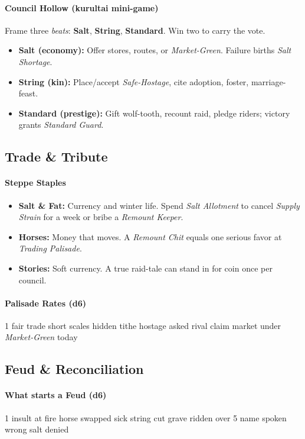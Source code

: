 \paragraph{Council Hollow (kurultai mini-game)}
Frame three \emph{beats}: \textbf{Salt}, \textbf{String}, \textbf{Standard}.  
Win two to carry the vote.
\begin{itemize}
\item \textbf{Salt (economy):} Offer stores, routes, or \emph{Market-Green}. Failure births \emph{Salt Shortage}.
\item \textbf{String (kin):} Place/accept \emph{Safe-Hostage}, cite adoption, foster, marriage-feast.
\item \textbf{Standard (prestige):} Gift wolf-tooth, recount raid, pledge riders; victory grants \emph{Standard Guard}.
\end{itemize}
\subsection*{Trade \& Tribute}

\paragraph{Steppe Staples}
\begin{itemize}
\item \textbf{Salt \& Fat:} Currency and winter life. Spend \emph{Salt Allotment} to cancel \emph{Supply Strain} for a week or bribe a \emph{Remount Keeper}.
\item \textbf{Horses:} Money that moves. A \emph{Remount Chit} equals one serious favor at \emph{Trading Palisade}.
\item \textbf{Stories:} Soft currency. A true raid-tale can stand in for coin once per council.
\end{itemize}

\paragraph{Palisade Rates (d6)}
1 fair trade  short scales  hidden tithe  hostage asked  rival claim  market under \emph{Market-Green} today
\subsection*{Feud \& Reconciliation}

\paragraph{What starts a Feud (d6)}
1 insult at fire  horse swapped sick  string cut  grave ridden over  
5 name spoken wrong  salt denied

